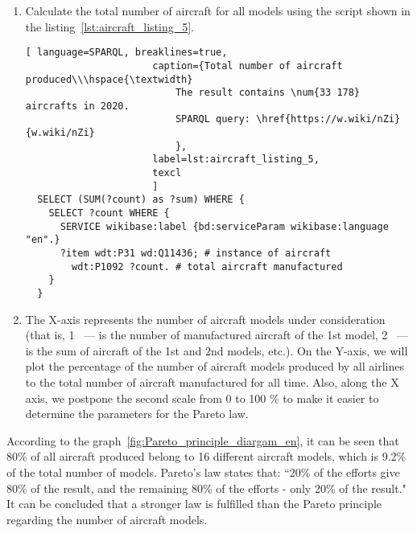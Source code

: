 \begin{enumerate} 
  \item Calculate the total number of aircraft for all models using the script shown in the listing~\ref{lst:aircraft_listing_5}.

  \begin{lstlisting}[ language=SPARQL, breaklines=true,  
                      caption={Total number of aircraft produced\\\hspace{\textwidth}
                          The result contains \num{33 178} aircrafts in 2020.
                          SPARQL query: \href{https://w.wiki/nZi}{w.wiki/nZi}
                          },
                      label=lst:aircraft_listing_5,
                      texcl 
                      ]
  SELECT (SUM(?count) as ?sum) WHERE {
    SELECT ?count WHERE {
      SERVICE wikibase:label {bd:serviceParam wikibase:language "en".}
      ?item wdt:P31 wd:Q11436; # instance of aircraft
        wdt:P1092 ?count. # total aircraft manufactured
    }
  }
  \end{lstlisting}

  \item The X-axis represents the number of aircraft models under consideration (that is, 1 ~--- is the number of manufactured aircraft of the 1st 
  model, 2 ~--- is the sum of aircraft of the 1st and 2nd models, etc.). On the Y-axis, we will plot the percentage of the number of aircraft models 
  produced by all airlines to the total number of aircraft manufactured for all time. Also, along the X axis, we postpone the second scale from 
  0 to 100 \% to make it easier to determine the parameters for the Pareto law.
\end{enumerate}

\begin{figure*}[h]

    \setlength{\fboxsep}{0pt}%
    \setlength{\fboxrule}{1pt}%

	\caption{Percentage of the number of aircraft models produced by all airlines to the total number of aircraft manufactured for all time, 2020.}%
    \label{fig:Pareto_principle_diargam_en}%
\end{figure*}

According to the graph~\ref{fig:Pareto_principle_diargam_en}, it can be seen that 80\% of all aircraft produced belong to 16 different aircraft 
models, which is 9.2\% of the total number of models. Pareto's law states that: ``20\% of the efforts give 80\% of the result, and the remaining 80\%
 of the efforts - only 20\% of the result." It can be concluded that a stronger law is fulfilled than the Pareto principle regarding the number 
 of aircraft models.

